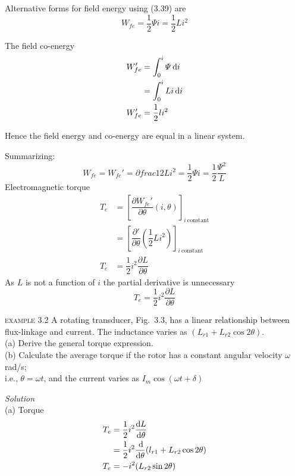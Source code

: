 \documentclass[a4paper,numbers=noenddot,12pt]{scrbook}
\begin{document}
Alternative forms for field energy using (3.39) are
\begin{equation}
    W_{fe} = \dfrac{1}{2} \varPsi i = \dfrac{1}{2}Li^2
    \label{eq:Eq3.40}
\end{equation}

The field co-energy
\begin{align*}
    W_{fe}' & = \int_0^{i} \varPsi \dif i \\
    & = \int_0^i Li \dif i \\
    W_{fe}' & = \dfrac{1}{2} li^2
\end{align*}

Hence the field energy and co-energy are equal in a linear system.

Summarizing:
\begin{equation}
    W_{fe} = W_{fe}' = ∂frac{1}{2} L i^2 = \dfrac{1}{2} \varPsi i = \dfrac{1}{2} \dfrac{\varPsi^2}{L}
    \label{eq:Eq3.41}
\end{equation}
Electromagnetic torque
\begin{align*}
    T_e & = {\left[ \dfrac{\partial W_{fe}'}{\partial \theta}(i,\theta)\right]}_{i \  \text{constant}}\\
    & = {\left[ \dfrac{\partial '}{\partial \theta}\left(\dfrac{1}{2} L i^2 \right)\right]}_{i \  \text{constant}} \\
    T_e & = \dfrac{1}{2} i^2 \dfrac{\partial L}{\partial \theta}
\end{align*}
As $L$ is not a function of $i$ the partial derivative is unnecessary
\begin{equation}
    T_e = \dfrac{1}{2} i^2 \dfrac{\partial L}{\partial \theta}
    \label{eq:Eq3.42}
\end{equation}

\noindent \textsc{example} 3.2 A rotating transducer, Fig.\ 3.3, has a linear relationship between flux-linkage and current. The inductance varies as $(L_{r1} + L_{r2} \cos 2 \theta)$.\\
(a) Derive the general torque expression.\\
(b) Calculate the average torque if the rotor has a constant angular velocity $\omega$ rad/s;\\
i.e., \hspace{10pt} $\theta = \omega t$, and the current varies as $I_m \cos (\omega t + \delta)$

\noindent\textit{Solution} \\ 
(a) Torque
\begin{align}
    T_e & = \dfrac{1}{2} i^2 \dfrac{\dif L}{\dif \theta} \nonumber \\
    & = \dfrac{1}{2} i^2 \dfrac{\dif}{\dif \theta} (l_{r1} + L_{r2} \cos 2 \theta) \nonumber \\
    T_e & = - i^2(L_{r2} \sin2\theta)
    \label{eq:Eq3.43}
\end{align}
\end{document}
